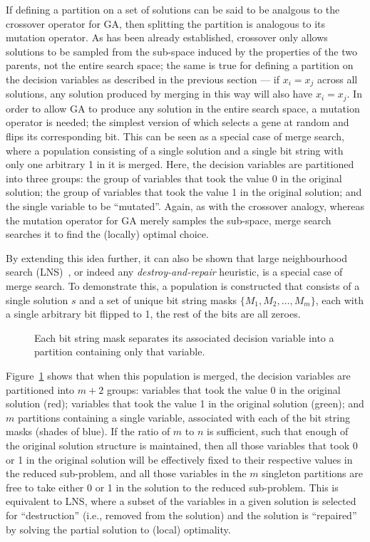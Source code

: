 \documentclass[journal]{IEEEtran}
\begin{document}
\medskip

If defining a partition on a set of solutions can be said to be analgous to the crossover operator for GA, then splitting the partition is analogous to its mutation operator. As has been already established, crossover only allows solutions to be sampled from the sub-space induced by the properties of the two parents, not the entire search space; the same is true for defining a partition on the decision variables as described in the previous section --- if $x_i = x_j$ across all solutions, any solution produced by merging in this way will also have $x_i = x_j$. In order to allow GA to produce any solution in the entire search space, a mutation operator is needed; the simplest version of which selects a gene at random and flips its corresponding bit. This can be seen as a special case of merge search, where a population consisting of a single solution and a single bit string with only one arbitrary 1 in it is merged. Here, the decision variables are partitioned into three groups: the group of variables that took the value 0 in the original solution; the group of variables that took the value 1 in the original solution; and the single variable to be ``mutated''. Again, as with the crossover analogy, whereas the mutation operator for GA merely samples the sub-space, merge search searches it to find the (locally) optimal choice.

By extending this idea further, it can also be shown that large neighbourhood search (LNS)~\cite{lns-book}, or indeed any \emph{destroy-and-repair} heuristic, is a special case of merge search. To demonstrate this, a population is constructed that consists of a single solution $s$ and a set of unique bit string masks $\{M_1,M_2,\dots,M_m\}$, each with a single arbitrary bit flipped to 1, the rest of the bits are all zeroes. 

\begin{figure}[h]
\centering
{}
\caption[Demonstrtation that Merge Search is equivalent to LNS]
       {Each bit string mask separates its associated decision variable into a partition containing only that variable.}
\label{fig:lns-merge}
\end{figure}

Figure~\ref{fig:lns-merge} shows that when this population is merged, the decision variables are partitioned into $m+2$ groups: variables that took the value 0 in the original solution (red); variables that took the value 1 in the original solution (green); and $m$ partitions containing a single variable, associated with each of the bit string masks (shades of blue). If the ratio of $m$ to $n$ is sufficient, such that enough of the original solution structure is maintained, then all those variables that took 0 or 1 in the original solution will be effectively fixed to their respective values in the reduced sub-problem, and all those variables in the $m$ singleton partitions are free to take either 0 or 1 in the solution to the reduced sub-problem. This is equivalent to LNS, where a subset of the variables in a given solution is selected for ``destruction'' (i.e., removed from the solution) and the solution is ``repaired'' by solving the partial solution to (local) optimality. 
\end{document}
